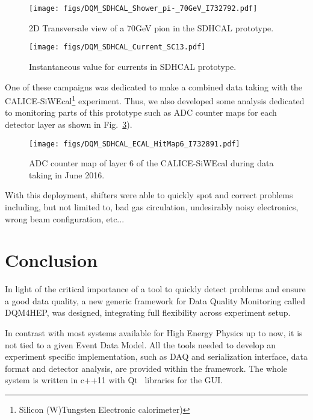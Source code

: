 \documentclass[journal]{IEEEtran}
\begin{document}
\begin{figure}[htbp]
  \begin{center}
    \texttt{[image: figs/DQM\_SDHCAL\_Shower\_pi-\_70GeV\_I732792.pdf]}
    \caption{\label{fig:DQMEventDisplay} 2D Transversale view of a 70GeV pion in the SDHCAL prototype.}
  \end{center}
\end{figure}

\begin{figure}[htbp]
  \begin{center}
    \texttt{[image: figs/DQM\_SDHCAL\_Current\_SC13.pdf]}
    \caption{\label{fig:DQMCurrents} Instantaneous value for currents in SDHCAL prototype.}
  \end{center}
\end{figure}

One of these campaigns was dedicated to make a combined data taking with the CALICE-SiWEcal\footnote{Silicon (W)Tungsten Electronic calorimeter)} experiment. Thus, we also developed some analysis dedicated to monitoring parts of this prototype such as ADC counter maps for each detector layer as shown in  Fig.~\ref{fig:DQMEcalDisplay}).

\begin{figure}[htbp]
  \begin{center}
    \texttt{[image: figs/DQM\_SDHCAL\_ECAL\_HitMap6\_I732891.pdf]}
    \caption{\label{fig:DQMEcalDisplay} ADC counter map of layer 6 of the CALICE-SiWEcal during data taking in June 2016.}
  \end{center}
\end{figure}

With this deployment, shifters were able to quickly spot and correct problems including, but not limited to, bad gas circulation, undesirably noisy electronics, wrong beam configuration, etc...

\section{Conclusion}
In light of the critical importance of a tool to quickly detect problems and ensure a good data quality, a new generic framework for Data Quality Monitoring called DQM4HEP, was designed, integrating full flexibility across experiment setup.

In contrast with most systems available for High Energy Physics up to now, it is not tied to a given Event Data Model. All the tools needed to develop an experiment specific implementation, such as DAQ and serialization interface, data format and detector analysis, are provided within the framework. The whole system is written in c++11 with Qt~\cite{QT} libraries for the GUI.
\end{document}
